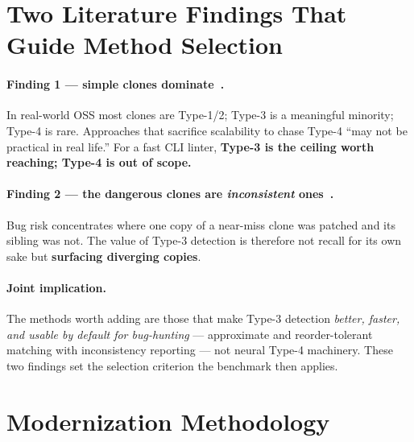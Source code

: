 \documentclass[10pt,a4paper]{article}
\begin{document}
\section{Two Literature Findings That Guide Method Selection}
\label{sec:findings}

\paragraph{Finding 1 --- simple clones dominate~\cite{toma}.} In real-world OSS most clones are
Type-1/2; Type-3 is a meaningful minority; Type-4 is rare. Approaches that sacrifice scalability to
chase Type-4 ``may not be practical in real life.'' For a fast CLI linter, \textbf{Type-3 is the
ceiling worth reaching; Type-4 is out of scope.}

\paragraph{Finding 2 --- the dangerous clones are \emph{inconsistent} ones~\cite{conqat}.} Bug risk
concentrates where one copy of a near-miss clone was patched and its sibling was not. The value of
Type-3 detection is therefore not recall for its own sake but \textbf{surfacing diverging copies}.

\paragraph{Joint implication.} The methods worth adding are those that make Type-3 detection
\emph{better, faster, and usable by default for bug-hunting} --- approximate and reorder-tolerant
matching with inconsistency reporting --- not neural Type-4 machinery. These two findings set the
selection criterion the benchmark then applies.

\section{Modernization Methodology}
\label{sec:method}
\end{document}
